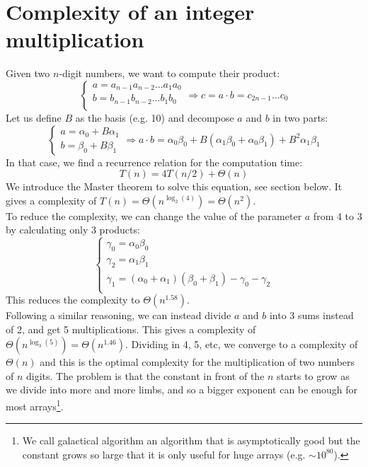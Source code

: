 \documentclass[12pt, openany]{report}
\theoremstyle{definition}
\begin{document}
\section{Complexity of an integer multiplication}\label{sec:int_mult}
Given two $n$-digit numbers, we want to compute their product:
\begin{equation}
  	\begin{cases}
		a = a_{n-1}a_{n-2}...a_1a_0\\
		b = b_{n-1}b_{n-2}...b_1b_0\\
  	\end{cases}
	\Longrightarrow c=a\cdot b = c_{2n-1}...c_0
\end{equation}
Let us define $B$ as the basis (e.g. 10) and decompose $a$ and $b$ in two parts:
\begin{equation}
	\begin{cases}
		a = \alpha_0+B\alpha_1\\
		b = \beta_0+B\beta_1
	\end{cases} \Longrightarrow a\cdot b = \alpha_0\beta_0 + B(\alpha_1\beta_0 + \alpha_0\beta_1)+B^2 \alpha_1\beta_1
\end{equation}
In that case, we find a recurrence relation for the computation time:
\begin{equation}
	T(n) = 4T(n/2) + \Theta(n)
\end{equation}
We introduce the Master theorem to solve this equation, see section below. It gives a complexity of $T(n) = \Theta(n^{\log_2(4)}) = \Theta(n^2)$.\\
To reduce the complexity, we can change the value of the parameter $a$ from 4 to 3 by calculating only 3 products:
\begin{equation}
	\begin{cases}
		\gamma_0 = \alpha_0\beta_0\\
		\gamma_2 = \alpha_1\beta_1\\
		\gamma_1 = (\alpha_0+\alpha_1)(\beta_0+\beta_1)-\gamma_0-\gamma_2\\
	\end{cases}
\end{equation}
This reduces the complexity to $\Theta(n^{1.58})$. \\
Following a similar reasoning, we can instead divide $a$ and $b$ into 3 sums instead of 2, and get 5 multiplications. This gives a complexity of $\Theta(n^{\log_3(5)}) = \Theta(n^{1.46})$. Dividing in 4, 5, etc, we converge to a complexity of $\Theta(n)$ and this is the optimal complexity for the multiplication of two numbers of $n$ digits. The problem is that the constant in front of the $n$ starts to grow as we divide into more and more limbs, and so a bigger exponent can be enough for most arrays\footnote{We call galactical algorithm an algorithm that is asymptotically good but the constant grows so large that it is only useful for huge arrays (e.g. $\sim10^{80}$).}.
\end{document}
